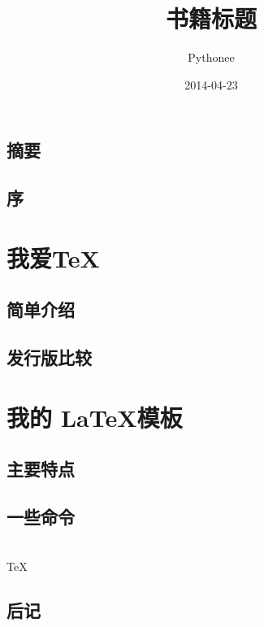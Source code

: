 \documentclass[fancyhdr,adobefonts,oneside,hyperref,openany,a4paper,UTF8]{ctexbook}
\author{Pythonee}
\title{书籍标题}
\date{2014-04-23}
\begin{document}
\maketitle


\frontmatter
\tableofcontents
\listoftables
\listoffigures
\setcounter{page}{0}
\chapter{摘要}
\lipsum[1]
\chapter{序}
\lipsum[1]


\mainmatter
\part{我爱\TeX}
\chapter{简单介绍}
\lipsum

\chapter{发行版比较}
\lipsum

\part{我的 \LaTeX 模板}
\chapter{主要特点}
\lipsum

\chapter{一些命令}
\cpp \\
\TeX \cite{knuth,lamport}

\backmatter
\chapter{后记}
\lipsum[1]

\appendix



\end{document}
